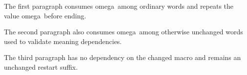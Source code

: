 
\hsize=220pt \vsize=240pt
\def\variant{omega}
The first paragraph consumes \variant\ among ordinary words and repeats the value \variant\ before ending.

The second paragraph also consumes \variant\ among otherwise unchanged words used to validate meaning dependencies.

The third paragraph has no dependency on the changed macro and remains an unchanged restart suffix.
\bye
